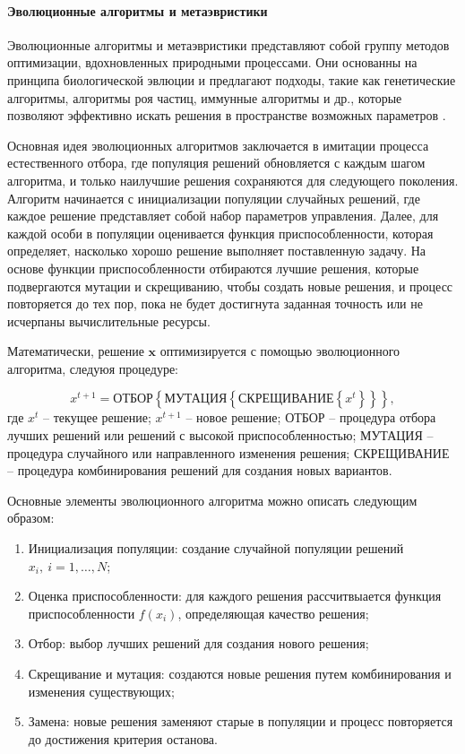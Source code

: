 \paragraph{Эволюционные алгоритмы и метаэвристики}\label{sec:ch4/sec2/subsec1/subsubsec6}
Эволюционные алгоритмы и метаэвристики представляют собой группу методов оптимизации,
вдохновленных природными процессами.
Они основанны на принципа биологической эвлюции и предлагают подходы, такие как генетические алгоритмы,
алгоритмы роя частиц, иммунные алгоритмы и др., которые позволяют эффективно искать решения
в пространстве возможных параметров \cite{zhang2015comparision}.

Основная идея эволюционных алгоритмов заключается в имитации процесса естественного отбора,
где популяция решений обновляется с каждым шагом алгоритма, и только наилучшие решения
сохраняются для следующего поколения. Алгоритм начинается с инициализации популяции случайных
решений, где каждое решение представляет собой набор параметров управления. Далее, для каждой
особи в популяции оценивается функция приспособленности, которая определяет, насколько хорошо
решение выполняет поставленную задачу. На основе функции приспособленности отбираются лучшие
решения, которые подвергаются мутации и скрещиванию, чтобы создать новые решения, и процесс
повторяется до тех пор, пока не будет достигнута заданная точность или не исчерпаны
вычислительные ресурсы.

Математически, решение $\mathbf{x}$ оптимизируется с помощью эволюционного алгоритма, следуюя
процедуре:

\begin{equation*}
    x^{t+1} = \text{ОТБОР} \left\{
    \text{МУТАЦИЯ} \left\{
    \text{СКРЕЩИВАНИЕ} \left\{
    x^t
    \right\}
    \right\}
    \right\},
\end{equation*}
где $x^t$ -- текущее решение;
$x^{t+1}$ -- новое решение;
$\text{ОТБОР}$ -- процедура отбора лучших решений или решений с высокой приспособленностью;
$\text{МУТАЦИЯ}$ -- процедура случайного или направленного изменения решения;
$\text{СКРЕЩИВАНИЕ}$ -- процедура комбинирования решений для создания новых вариантов.

Основные элементы эволюционного алгоритма можно описать следующим образом:

\begin{enumerate}
    \item Инициализация популяции: создание случайной популяции решений $x_i,~i = 1, \ldots, N$;
    \item Оценка приспособленности: для каждого решения рассчитвыается функция приспособленности $f(x_i)$,
          определяющая качество решения;
    \item Отбор: выбор лучших решений для создания нового решения;
    \item Скрещивание и мутация: создаются новые решения путем комбинирования и изменения существующих;
    \item Замена: новые решения заменяют старые в популяции и процесс повторяется до достижения критерия останова.
\end{enumerate}

